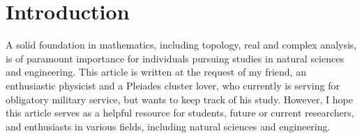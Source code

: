 \chapter{Introduction}
A solid foundation in mathematics, including topology, real and complex analysis, 
is of paramount importance for individuals pursuing studies in natural sciences 
and engineering. This article is written at the request of my friend, an enthusiastic physicist
and a Pleiades cluster lover, who currently is serving for obligatory military service,
but wants to keep track of his study. However, I hope this article serves as a helpful
resource for students, future or current researchers, and enthusiasts in various
fields, including natural sciences and engineering.
\cite{temporary02}